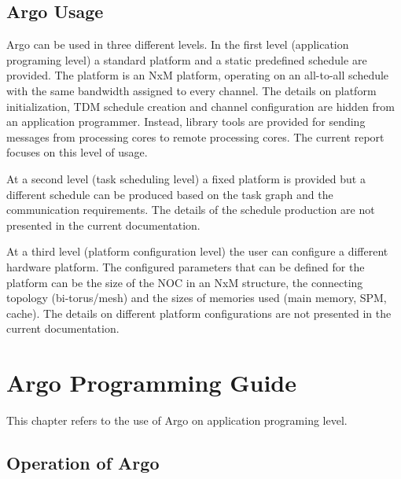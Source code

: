 \documentclass[a4paper,fontsize=10pt,twoside,DIV15,BCOR12mm,headinclude=true,footinclude=false,pagesize,bibtotoc]{scrbook}
\begin{document}
\section{Argo Usage}

Argo can be used in three different levels. In the first level (application programing level)
a standard platform and a static predefined schedule are provided. The platform is an NxM platform,%
operating on an all-to-all schedule with the same bandwidth assigned to every channel. The details 
on platform initialization, TDM schedule creation and channel configuration are hidden from an
application programmer. Instead, library tools are provided for sending messages from
processing cores to remote processing cores. The current report focuses on this level of usage.

At a second level (task scheduling level) a fixed platform is provided but a different schedule 
can be produced based on the task graph and the communication requirements. The details of the schedule
production are not presented in the current documentation.

At a third level (platform configuration level) the user can configure a different hardware platform.
The configured parameters that can be defined for the platform can be the size of the NOC in an NxM structure,
the connecting topology (bi-torus/mesh) and the sizes of memories used (main memory, SPM, cache).
The details on different platform configurations are not presented in the current documentation.




\chapter{Argo Programming Guide}
\label{chap:program}

This chapter refers to the use of Argo on application programing level.

\section{Operation of Argo}
\label{sec:oper}
\end{document}
